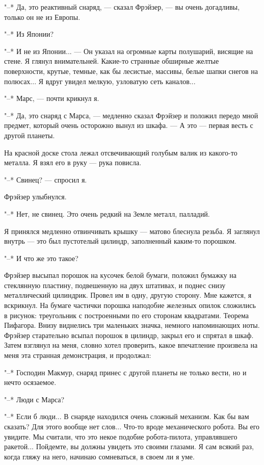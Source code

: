 "--* Да, это реактивный снаряд, --- сказал Фрэйзер, ---  вы  очень  догадливы,
только он не из Европы.

"--* Из Японии?

"--* И не из Японии... --- Он указал на огромные карты полушарий, висящие на
стене.  Я  глянул  внимательней.   Какие-то   странные   обширные   желтые
поверхности, крутые, темные, как бы лесистые, массивы, белые шапки  снегов
на полюсах... Я вдруг увидел мелкую, узловатую сеть каналов...

"--* Марс, --- почти крикнул я.

"--* Да, это снаряд с Марса, --- медленно сказал Фрэйзер  и  положил  передо
мной предмет, который очень осторожно вынул из шкафа. ---  А  это  ---  первая
весть с другой планеты.

На красной доске стола лежал отсвечивающий голубым валик  из  какого-то
металла. Я взял его в руку --- рука повисла.

"--* Свинец? --- спросил я.

Фрэйзер улыбнулся.

"--* Нет, не свинец. Это очень редкий на Земле металл, палладий.

Я принялся медленно отвинчивать крышку  ---  матово  блеснула  резьба.  Я
заглянул  внутрь  ---  это  был  пустотелый  цилиндр,  заполненный  каким-то
порошком.

"--* И что же это такое?

Фрэйзер высыпал порошок на кусочек белой  бумаги,  положил  бумажку  на
стеклянную  пластину,  подвешенную  на  двух  штативах,  и  поднес   снизу
металлический цилиндрик. Провел им в одну, другую сторону. Мне кажется,  я
вскрикнул. На бумаге частички порошка наподобие железных опилок  сложились
в рисунок: треугольник с построенными по его сторонам квадратами.  Теорема
Пифагора. Внизу виднелись три маленьких значка, немного напоминающих ноты.
Фрэйзер старательно всыпал порошок в цилиндр, закрыл его и спрятал в шкаф.
Затем  взглянул  на  меня,  словно  хотел  проверить,  какое   впечатление
произвела на меня эта странная демонстрация, и продолжал:

"--* Господин Макмур, снаряд принес с другой планеты не только вести, но и
нечто осязаемое.

"--* Люди с Марса?

"--* Если б люди... В снаряде находился очень сложный механизм. Как бы вам
сказать? Для этого вообще нет слов... Что-то вроде  механического  робота.
Вы  его  увидите.  Мы  считали,  что  это  некое  подобие   робота-пилота,
управлявшего ракетой... Пойдемте, вы должны увидеть это своими глазами.  Я
сам всякий раз, когда гляжу на него, начинаю сомневаться,  в  своем  ли  я
уме.


